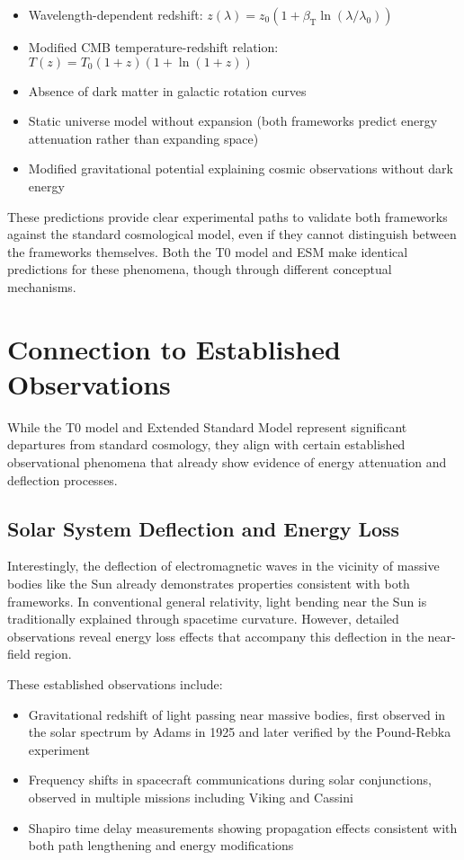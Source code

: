 \documentclass[12pt,a4paper]{article}
\newcommand{\betaT}{\beta_{\text{T}}}
\begin{document}
	\begin{itemize}
		\item Wavelength-dependent redshift: \(z(\lambda) = z_0 (1 + \betaT \ln(\lambda/\lambda_0))\)
		\item Modified CMB temperature-redshift relation: \(T(z) = T_0 (1+z)(1+\ln(1+z))\)
		\item Absence of dark matter in galactic rotation curves
		\item Static universe model without expansion (both frameworks predict energy attenuation rather than expanding space)
		\item Modified gravitational potential explaining cosmic observations without dark energy
	\end{itemize}
	
	These predictions provide clear experimental paths to validate both frameworks against the standard cosmological model, even if they cannot distinguish between the frameworks themselves. Both the T0 model and ESM make identical predictions for these phenomena, though through different conceptual mechanisms.
	
	\section{Connection to Established Observations}
	\label{sec:established_observations}
	
	While the T0 model and Extended Standard Model represent significant departures from standard cosmology, they align with certain established observational phenomena that already show evidence of energy attenuation and deflection processes.
	
	\subsection{Solar System Deflection and Energy Loss}
	\label{subsec:solar_deflection}
	
	Interestingly, the deflection of electromagnetic waves in the vicinity of massive bodies like the Sun already demonstrates properties consistent with both frameworks. In conventional general relativity, light bending near the Sun is traditionally explained through spacetime curvature. However, detailed observations reveal energy loss effects that accompany this deflection in the near-field region.
	
	These established observations include:
	
	\begin{itemize}
		\item Gravitational redshift of light passing near massive bodies, first observed in the solar spectrum by Adams in 1925 \cite{Adams1925} and later verified by the Pound-Rebka experiment \cite{Pound1960}
		\item Frequency shifts in spacecraft communications during solar conjunctions, observed in multiple missions including Viking and Cassini \cite{Bertotti2003}
		\item Shapiro time delay measurements showing propagation effects consistent with both path lengthening and energy modifications \cite{Shapiro1971}
	\end{itemize}
	
\end{document}
